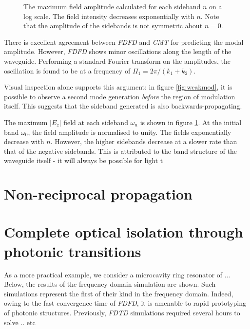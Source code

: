 \begin{figure}[t]
\centering
\setlength{\figH}{0.4\textwidth}
\setlength{\figW}{0.7\textwidth}

\caption[Maximum field amplitude at each sideband]{The maximum field amplitude calculated for each sideband $n$ on a log scale. The field intensity decreases exponentially with $n$. Note that the amplitude of the sidebands is not symmetric about $n=0$.}
\label{fig:sideamp}
\end{figure}

There is excellent agreement between \textit{FDFD} and \textit{CMT} for predicting the modal amplitude. However, \textit{FDFD} shows minor oscillations along the length of the waveguide. Performing a standard Fourier transform on the amplitudes, the oscillation is found to be at a frequency of $\Pi_1 = 2 \pi / (k_1 + k_2)$.

Visual inspection alone supports this argument: in figure \ref{fig:weakmod}, it is possible to observe a second mode generation \textit{before} the region of modulation itself. This suggests that the sideband generated is also backwards-propagating.

The maximum $|E_z|$ field at each sideband $\omega_n$ is shown in figure \ref{fig:sideamp}. At the initial band $\omega_0$, the field amplitude is normalised to unity. The fields exponentially decrease with $n$. However, the higher sidebands decrease at a slower rate than that of the negative sidebands. This is attributed to the band structure of the waveguide itself - it will always be possible for light t
\section{Non-reciprocal propagation}



\section{Complete optical isolation through photonic transitions}

As a more practical example, we consider a microcavity ring resonator of ... Below, the results of the frequency domain simulation are shown. Such simulations represent the first of their kind in the frequency domain. Indeed, owing to the fast convergence time of \textit{FDFD}, it is amenable to rapid prototyping of photonic structures. Previously, \textit{FDTD} simulations required several hours to solve .. etc

